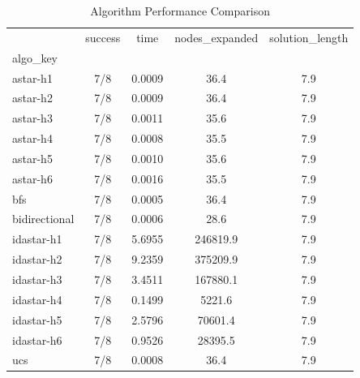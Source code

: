 \begin{table}
\caption{Algorithm Performance Comparison}
\label{tab:results}
\begin{tabular}{l|cccc}
\toprule
 & success & time & nodes_expanded & solution_length \\
algo_key &  &  &  &  \\
\midrule
astar-h1 & 7/8 & 0.0009 & 36.4 & 7.9 \\
astar-h2 & 7/8 & 0.0009 & 36.4 & 7.9 \\
astar-h3 & 7/8 & 0.0011 & 35.6 & 7.9 \\
astar-h4 & 7/8 & 0.0008 & 35.5 & 7.9 \\
astar-h5 & 7/8 & 0.0010 & 35.6 & 7.9 \\
astar-h6 & 7/8 & 0.0016 & 35.5 & 7.9 \\
bfs & 7/8 & 0.0005 & 36.4 & 7.9 \\
bidirectional & 7/8 & 0.0006 & 28.6 & 7.9 \\
idastar-h1 & 7/8 & 5.6955 & 246819.9 & 7.9 \\
idastar-h2 & 7/8 & 9.2359 & 375209.9 & 7.9 \\
idastar-h3 & 7/8 & 3.4511 & 167880.1 & 7.9 \\
idastar-h4 & 7/8 & 0.1499 & 5221.6 & 7.9 \\
idastar-h5 & 7/8 & 2.5796 & 70601.4 & 7.9 \\
idastar-h6 & 7/8 & 0.9526 & 28395.5 & 7.9 \\
ucs & 7/8 & 0.0008 & 36.4 & 7.9 \\
\bottomrule
\end{tabular}
\end{table}
